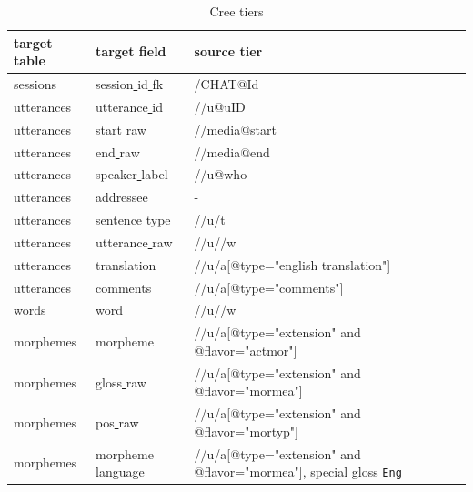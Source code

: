 \documentclass[a4paper, 11pt]{book}
\newcommand{\und}{\underline{{ }}\hspace{0.2mm}}	%
\begin{document}
\begin{table}[ht!]
	\centering
	\begin{tabular}{lll}
		\toprule
			\textbf{target table} & \textbf{target field} & \textbf{source tier} \\
		\midrule
			sessions 	& session\und id\und fk 	& /CHAT@Id \\
			utterances 	& utterance\und id	& //u@uID \\
			utterances 	& start\und raw		& //media@start \\
			utterances 	& end\und raw		& //media@end \\
			utterances 	& speaker\und label	& //u@who \\
			utterances 	& addressee			& - \\
			utterances 	& sentence\und type	& //u/t \\
			utterances 	& utterance\und raw	& //u//w \\
			utterances 	& translation		& //u/a[@type="english translation"] \\
			utterances 	& comments			& //u/a[@type="comments"] \\
			words	 	& word				& //u//w \\
			morphemes	& morpheme			& //u/a[@type="extension" and @flavor="actmor"] \\
			morphemes	& gloss\und raw		& //u/a[@type="extension" and @flavor="mormea"] \\
			morphemes	& pos\und raw		& //u/a[@type="extension" and @flavor="mortyp"] \\
			morphemes	& morpheme\und language		& //u/a[@type="extension" and @flavor="mormea"], special gloss \texttt{Eng} \\
		\bottomrule
	\end{tabular}
	\caption{Cree tiers}
	\label{tab:Cree tiers}
\end{table}
\end{document}
